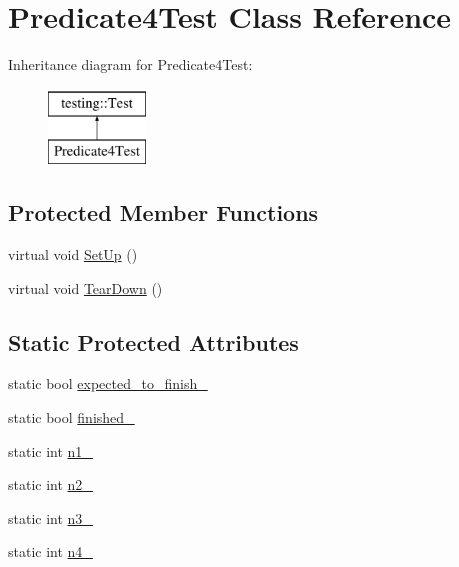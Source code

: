\hypertarget{class_predicate4_test}{\section{Predicate4\-Test Class Reference}
\label{class_predicate4_test}
}
Inheritance diagram for Predicate4\-Test\-:\begin{figure}[H]
\begin{center}
\leavevmode
\includegraphics[height=2.000000cm]{class_predicate4_test}
\end{center}
\end{figure}
\subsection*{Protected Member Functions}
\begin{DoxyCompactItemize}
\item 
virtual void \hyperlink{class_predicate4_test_afcf9db5dc68e97291813cdfeb2aaa5d2}{Set\-Up} ()
\item 
virtual void \hyperlink{class_predicate4_test_ab61983a4cdf3657b02bc2b81b67729c4}{Tear\-Down} ()
\end{DoxyCompactItemize}
\subsection*{Static Protected Attributes}
\begin{DoxyCompactItemize}
\item 
static bool \hyperlink{class_predicate4_test_a20600b5eda187c42ce4e812e77269654}{expected\-\_\-to\-\_\-finish\-\_\-}
\item 
static bool \hyperlink{class_predicate4_test_acfd174bf9dfb5a91afbcdca17e797888}{finished\-\_\-}
\item 
static int \hyperlink{class_predicate4_test_a8eb30cd283e613f7a2e501a3969be9ae}{n1\-\_\-}
\item 
static int \hyperlink{class_predicate4_test_a088fce743c747e3851c926cb3a87fda3}{n2\-\_\-}
\item 
static int \hyperlink{class_predicate4_test_a00ae6ae54c7d6639d448c036aedb6114}{n3\-\_\-}
\item 
static int \hyperlink{class_predicate4_test_ae42e23ce11e3f1c6b813496d6180cc67}{n4\-\_\-}
\end{DoxyCompactItemize}
